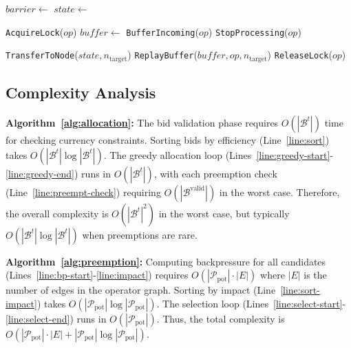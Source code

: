 \documentclass[lettersize,journal]{IEEEtran}
\begin{document}
\begin{algorithm}[h]
\SetAlgoLined
\SetAlgoNoEnd\scriptsize
{}


$barrier \leftarrow$ \;\label{line:barrier}
\;\label{line:align}
$state \leftarrow$ \;\label{line:snapshot}

\texttt{AcquireLock}($op$)\;\label{line:lock}
$buffer \leftarrow$ \texttt{BufferIncoming}($op$)\;\label{line:buffer}
\texttt{StopProcessing}($op$)\;\label{line:stop}

\texttt{TransferToNode}($state, n_{\text{target}}$)\;\label{line:transfer-state}
\;\label{line:restore}
\texttt{ReplayBuffer}($buffer, op, n_{\text{target}}$)\;\label{line:replay}
\texttt{ReleaseLock}($op$)\;\label{line:unlock}

\;
\caption{State Migration Protocol}
\label{alg:migration}
\end{algorithm}


\subsection{Complexity Analysis}
\label{subsec:complexity_analysis}

\textbf{Algorithm~\ref{alg:allocation}:} The bid validation phase requires $O(|\mathcal{B}^t|)$ time for checking currency constraints. Sorting bids by efficiency (Line~\ref{line:sort}) takes $O(|\mathcal{B}^t| \log |\mathcal{B}^t|)$. The greedy allocation loop (Lines~\ref{line:greedy-start}-\ref{line:greedy-end}) runs in $O(|\mathcal{B}^t|)$, with each preemption check (Line~\ref{line:preempt-check}) requiring $O(|\mathcal{B}^{\text{valid}}|)$ in the worst case. Therefore, the overall complexity is $O(|\mathcal{B}^t|^2)$ in the worst case, but typically $O(|\mathcal{B}^t| \log |\mathcal{B}^t|)$ when preemptions are rare.

\textbf{Algorithm~\ref{alg:preemption}:} Computing backpressure for all candidates (Lines~\ref{line:bp-start}-\ref{line:impact}) requires $O(|\mathcal{P}_{\text{pot}}| \cdot |E|)$ where $|E|$ is the number of edges in the operator graph. Sorting by impact (Line~\ref{line:sort-impact}) takes $O(|\mathcal{P}_{\text{pot}}| \log |\mathcal{P}_{\text{pot}}|)$. The selection loop (Lines~\ref{line:select-start}-\ref{line:select-end}) runs in $O(|\mathcal{P}_{\text{pot}}|)$. Thus, the total complexity is $O(|\mathcal{P}_{\text{pot}}| \cdot |E| + |\mathcal{P}_{\text{pot}}| \log |\mathcal{P}_{\text{pot}}|)$.
\end{document}
